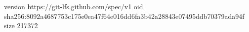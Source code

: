 version https://git-lfs.github.com/spec/v1
oid sha256:8092a4687753c175e0ea47f64e016dd6fa3b42a28843e07495ddb70379ada94f
size 217372
